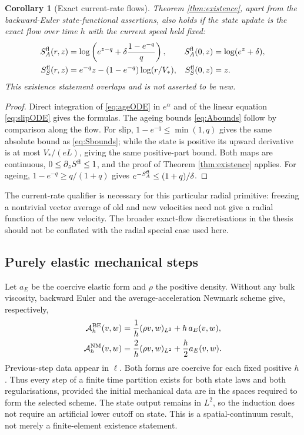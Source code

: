 \documentclass[11pt,a4paper]{article}
\newtheorem{corollary}[theorem]{Corollary}
\theoremstyle{definition}\newtheorem{definition}[theorem]{Definition}
\theoremstyle{remark}\newtheorem{remark}[theorem]{Remark}
\newcommand{\A}{\mathcal A}
\numberwithin{equation}{section}
\begin{document}
\begin{corollary}[Exact current-rate flows]\label{cor:flow}
Theorem \ref{thm:existence}, apart from the backward-Euler state-functional assertions, also holds if the state update is the exact flow over time $h$ with the \emph{current} speed held fixed:
\begin{align}
 S_A^{\rm fl}(r,z)&=\log\left(e^{z-q}+\delta\frac{1-e^{-q}}q\right),
      &S_A^{\rm fl}(0,z)&=\log(e^z+\delta),\label{eq:ageflow}\\
 S_S^{\rm fl}(r,z)&=e^{-q}z-(1-e^{-q})\log(r/V_*),
      &S_S^{\rm fl}(0,z)&=z.\label{eq:slipflow}
\end{align}
This existence statement overlaps \cite[Corollary 3.8]{PippingThesis} and is not asserted to be new.
\end{corollary}
\begin{proof}
Direct integration of \eqref{eq:ageODE} in $e^\alpha$ and of the linear equation \eqref{eq:slipODE} gives the formulas. The ageing bounds \eqref{eq:Abounds} follow by comparison along the flow. For slip, $1-e^{-q}\le\min(1,q)$ gives the same absolute bound as \eqref{eq:Sbounds}; while the state is positive its upward derivative is at most $V_*/(eL)$, giving the same positive-part bound. Both maps are continuous, $0\le\partial_zS^{\rm fl}\le1$, and the proof of Theorem \ref{thm:existence} applies. For ageing, $1-e^{-q}\ge q/(1+q)$ gives $e^{-S_A^{\rm fl}}\le(1+q)/\delta$.
\end{proof}
The current-rate qualifier is necessary for this particular radial primitive: freezing a nontrivial vector average of old and new velocities need not give a radial function of the new velocity. The broader exact-flow discretisations in the thesis should not be conflated with the radial special case used here.

\subsection{Purely elastic mechanical steps}
Let $a_E$ be the coercive elastic form and $\rho$ the positive density. Without any bulk viscosity, backward Euler and the average-acceleration Newmark scheme give, respectively,
\begin{align}
 \A_h^{\rm BE}(v,w)&=\frac1h(\rho v,w)_{L^2}+h\,a_E(v,w),\label{eq:BEform}\\
 \A_h^{\rm NM}(v,w)&=\frac2h(\rho v,w)_{L^2}+\frac h2a_E(v,w).\label{eq:NMform}
\end{align}
Previous-step data appear in $\ell$. Both forms are coercive for each fixed positive $h$. Thus every step of a finite time partition exists for both state laws and both regularisations, provided the initial mechanical data are in the spaces required to form the selected scheme. The state output remains in $L^2$, so the induction does not require an artificial lower cutoff on state. This is a spatial-continuum result, not merely a finite-element existence statement.
\end{document}
